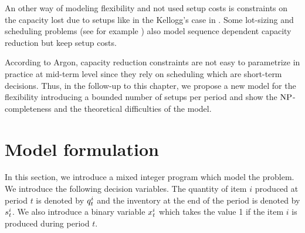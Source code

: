 \medskip

An other way of modeling flexibility and not used setup costs is constraints on the capacity lost due to setups like in the Kellogg's case in \cite[Chapter 4]{Pochet2006}. Some lot-sizing and scheduling problems (see for example \cite{Guimaraes2014}) also model sequence dependent capacity reduction but keep setup costs.




\medskip


According to Argon, capacity reduction constraints are not easy to parametrize in practice at mid-term level since they rely on scheduling which are short-term decisions. Thus, in the follow-up to this chapter, we propose a new model for the flexibility introducing a bounded number of setups per period and show the $\operatorname{NP}$-completeness and the theoretical difficulties of the model.



\section{Model formulation}
\label{sec:PDP:deterministic:model}


In this section, we introduce a mixed integer program which model the problem.
We introduce the following decision variables. The quantity of item $i$ produced at period $t$ is denoted by $q_t^i$ and the inventory at the end of the period is denoted by $s_t^i$. We also introduce a binary variable $x_t^i$ which takes the value 1 if the item $i$ is produced during period $t$.

